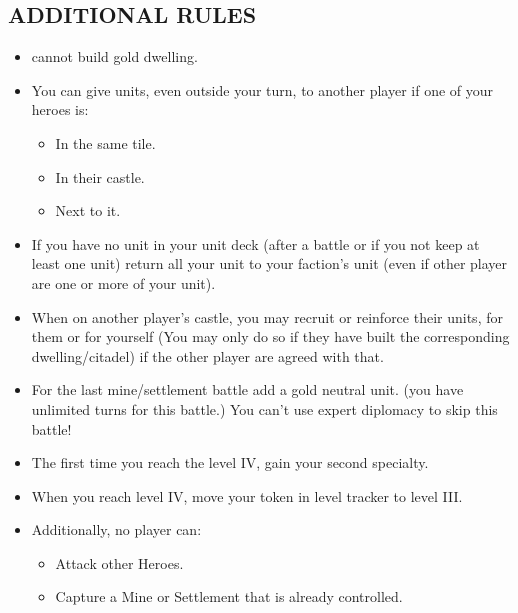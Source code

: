 \begin{multicols*}{2}
\subsection*{\MakeUppercase{Additional Rules}}
\begin{itemize}
    \item cannot build gold dwelling.
    \item You can give units, even outside your turn, to another player if one of your heroes is:
    \begin{itemize}
        \item In the same tile. 
        \item In their castle.
        \item Next to it.
    \end{itemize}
    \item If you have no unit in your unit deck (after a battle or if you not keep at least one unit) return all your unit to your faction's unit (even if other player are one or more of your unit).
    \item When on another player's castle, you may recruit or reinforce their units, for them or for yourself (You may only do so if they have built the corresponding dwelling/citadel) if the other player are agreed with that.
    \item For the last mine/settlement battle add a gold neutral unit. (you have unlimited turns for this battle.) You can't use expert diplomacy to skip this battle!
    \item The first time you reach the level IV, gain your second specialty.
    \item When you reach level IV, move your token in level tracker to level III.
    \item Additionally, no player can:
    \begin{itemize}
        \item Attack other Heroes.
        \item Capture a Mine or Settlement that is already controlled.
    \end{itemize}
\end{itemize}

\end{multicols*}

\newpage

